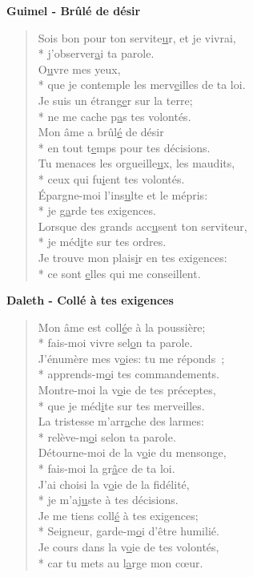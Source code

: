 \textbf{Guimel - Brûlé de désir}
\begin{verse}
Sois bon pour ton servite\underline{u}r, et je vivrai, \\*
j’observer\underline{a}i ta parole. \\
O\underline{u}vre mes yeux, \\*
que je contemple les merv\underline{e}illes de ta loi. \\
Je suis un étrang\underline{e}r sur la terre; \\*
ne me cache p\underline{a}s tes volontés. \\
Mon âme a brûl\underline{é} de désir \\*
en tout t\underline{e}mps pour tes décisions. \\
Tu menaces les orgueille\underline{u}x, les maudits, \\*
ceux qui fu\underline{i}ent tes volontés. \\
Épargne-moi l’ins\underline{u}lte et le mépris: \\*
je g\underline{a}rde tes exigences. \\
Lorsque des grands acc\underline{u}sent ton serviteur, \\*
je méd\underline{i}te sur tes ordres. \\
Je trouve mon plais\underline{i}r en tes exigences: \\*
ce sont \underline{e}lles qui me conseillent. \\
\end{verse}
\textbf{Daleth - Collé à tes exigences}
\begin{verse}
Mon âme est coll\underline{é}e à la poussière; \\*
fais-moi vivre sel\underline{o}n ta parole. \\
J’énumère mes v\underline{o}ies: tu me réponds ; \\*
apprends-m\underline{o}i tes commandements. \\
Montre-moi la v\underline{o}ie de tes préceptes, \\*
que je méd\underline{i}te sur tes merveilles. \\
La tristesse m’arr\underline{a}che des larmes: \\*
relève-m\underline{o}i selon ta parole. \\
Détourne-moi de la v\underline{o}ie du mensonge, \\*
fais-moi la gr\underline{â}ce de ta loi. \\
J’ai choisi la v\underline{o}ie de la fidélité, \\*
je m’aj\underline{u}ste à tes décisions. \\
Je me tiens coll\underline{é} à tes exigences; \\*
Seigneur, garde-m\underline{o}i d’être humilié. \\
Je cours dans la v\underline{o}ie de tes volontés, \\*
car tu mets au l\underline{a}rge mon cœur. \\
\end{verse}

